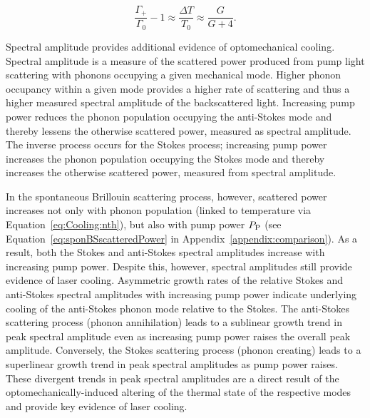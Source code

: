 \begin{equation}
  \frac{\Gamma_{+}}{\Gamma_{0}} - 1 \approx \frac{\Delta T}{T_{0}} \approx \frac{G}{G + 4}.
  \label{eq:Cooliong:two methods of getting temperature}
\end{equation}

Spectral amplitude provides additional evidence of optomechanical cooling. Spectral amplitude is a measure of the scattered power produced from pump light scattering with phonons occupying a given mechanical mode. Higher phonon occupancy within a given mode provides a higher rate of scattering and thus a higher measured spectral amplitude of the backscattered light. Increasing pump power reduces the phonon population occupying the anti-Stokes mode and thereby lessens the otherwise scattered power, measured as spectral amplitude. The inverse process occurs for the Stokes process; increasing pump power increases the phonon population occupying the Stokes mode and thereby increases the otherwise scattered power, measured from spectral amplitude.

In the spontaneous Brillouin scattering process, however, scattered power increases not only with phonon population (linked to temperature via Equation~\ref{eq:Cooling:nth}), but also with pump power \(P_{\rm P}\) (see Equation~\ref{eq:sponBSscatteredPower} in Appendix~\ref{appendix:comparison}). As a result, both the Stokes and anti-Stokes spectral amplitudes increase with increasing pump power. Despite this, however, spectral amplitudes still provide evidence of laser cooling. Asymmetric growth rates of the relative Stokes and anti-Stokes spectral amplitudes with increasing pump power indicate underlying cooling of the anti-Stokes phonon mode relative to the Stokes. The anti-Stokes scattering process (phonon annihilation) leads to a sublinear growth trend in peak spectral amplitude even as increasing pump power raises the overall peak amplitude. Conversely, the Stokes scattering process (phonon creating) leads to a superlinear growth trend in peak spectral amplitudes as pump power raises. These divergent trends in peak spectral amplitudes are a direct result of the optomechanically-induced altering of the thermal state of the respective modes and provide key evidence of laser cooling.

